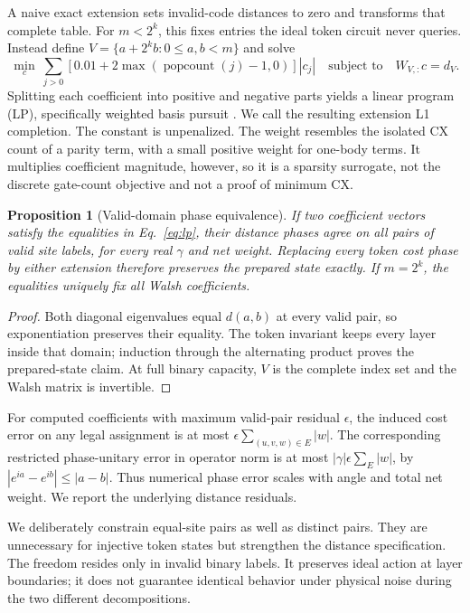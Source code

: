 \documentclass[manuscript,screen,review]{acmart}
\newtheorem{proposition}{Proposition}
\begin{document}
A naive exact extension sets invalid-code distances to zero and transforms
that complete table. For $m<2^k$, this fixes entries the ideal token circuit
never queries. Instead define
$V=\{a+2^kb:0\leq a,b<m\}$ and solve
\begin{equation}
 \min_c\ \sum_{j>0}\left[0.01+2\max(\operatorname{popcount}(j)-1,0)\right]|c_j|
 \quad\text{subject to}\quad W_{V,:}c=d_V.
 \label{eq:lp}
\end{equation}
Splitting each coefficient into positive and negative parts yields a linear
program (LP), specifically weighted basis pursuit \cite{chen1998basispursuit}. We call the resulting extension L1 completion. The constant is unpenalized.
The weight resembles the isolated
CX count of a parity term, with a small positive weight for one-body terms.
It multiplies coefficient magnitude, however, so it is a sparsity surrogate,
not the discrete gate-count objective and not a proof of minimum CX.

\begin{proposition}[Valid-domain phase equivalence]
\label{prop:completion}
If two coefficient vectors satisfy the equalities in Eq.~\eqref{eq:lp}, their
distance phases agree on all pairs of valid site labels, for every real
$\gamma$ and net weight. Replacing every token cost phase by either extension
therefore preserves the prepared state exactly. If $m=2^k$, the equalities
uniquely fix all Walsh coefficients.
\end{proposition}
\begin{proof}
Both diagonal eigenvalues equal $d(a,b)$ at every valid pair, so exponentiation
preserves their equality. The token invariant keeps every layer inside that
domain; induction through the alternating product proves the prepared-state
claim. At full binary capacity, $V$ is the complete index set and the Walsh
matrix is invertible.
\end{proof}

For computed coefficients with maximum valid-pair residual $\epsilon$,
the induced cost error on any legal assignment is at most
$\epsilon\sum_{(u,v,w)\in E}|w|$. The corresponding restricted phase-unitary
error in operator norm is at most $|\gamma|\epsilon\sum_E|w|$, by
$|e^{ia}-e^{ib}|\leq|a-b|$. Thus numerical phase error scales with angle
and total net weight. We report the underlying distance residuals.

We deliberately constrain equal-site pairs as well as distinct pairs. They
are unnecessary for injective token states but strengthen the distance
specification. The
freedom resides only in invalid binary labels. It preserves ideal action at
layer boundaries; it does not guarantee identical behavior under physical
noise during the two different decompositions.
\end{document}
